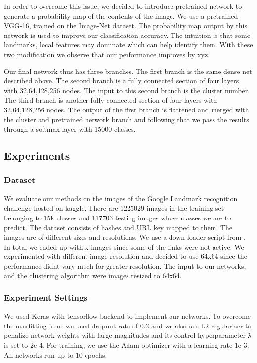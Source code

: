 \documentclass{article}
\begin{document}
In order to overcome this issue, we decided to introduce pretrained network to generate a probability map of the contents of the image. We use a pretrained VGG-16, trained on the Image-Net dataset. The probability map output by this network is used to improve our classification accuracy. The intuition is that some landmarks, local features may dominate which can help identify them. With these two modification we observe that our performance improves by xyz.

Our final network thus has three branches. The first branch is the same dense net described above. The second branch is a fully connected section of four layers with 32,64,128,256 nodes. The input to this second branch is the cluster number. The third branch is another fully connected section of four layers with 32,64,128,256 nodes. 
The output of the first branch is flattened and merged with the cluster and pretrained network branch and following that we pass the results through a softmax layer with 15000 classes.

\subsection{Experiments}

\subsubsection{Dataset}

We evaluate our methods on the images of the Google Landmark recognition challenge hosted on kaggle.{\cite{landmarkchallenge}}
There are 1225029 images in the training set belonging to 15k classes and 117703 testing images whose classes we are to predict. The dataset consists of hashes and URL key mapped to them. The images are of different sizes and resolutions. We use a down loader script from {\cite{source}}. In total we ended up with x images since some of the links were not active.
We experimented with different image resolution and decided to use 64x64 since the performance didnt vary much for greater resolution. The input to our networks, and the clustering algorithm were images resized to 64x64.



\subsubsection{Experiment Settings}
We used Keras {\cite{keras}} with tensorflow backend {\cite{tensorflow}}to implement our networks. To overcome the overfitting issue we used dropout rate of 0.3 and we also use L2 regularizer to penalize network
weights with large magnitudes and its control hyperparameter  λ is set to
2e-4. For training, we use the Adam optimizer {\cite{adam}} with a learning rate 1e-3. All
networks run up to 10 epochs.
\end{document}
